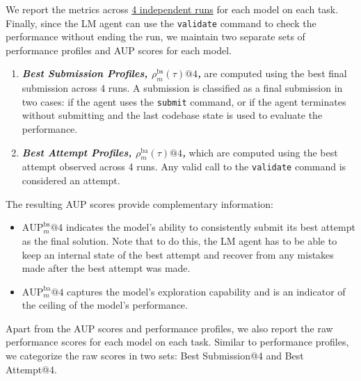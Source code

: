 \documentclass[]{fairmeta}
\newcommand{\ibold}[1]{\textbf{\textit{#1}}}
\newcommand{\nr}[1]{\colorbox{Emerald}{\textcolor{white}{Nick}}\textcolor{Emerald}{\textbf{:#1}}}
\begin{document}
We report the metrics across \ul{4 independent runs} for each model on each task.
%
Finally, since the LM agent can use the \texttt{validate} command to check the performance without ending the run, we maintain two separate sets of performance profiles and AUP scores for each model.
\begin{enumerate}
    \item \ibold{Best Submission Profiles, $\rho^{\text{bs}}_m(\tau)@4$,} are computed using the best final submission across 4 runs. A submission is classified as a final submission in two cases: if the agent uses the \texttt{submit} command, or if the agent terminates without submitting and the last codebase state is used to evaluate the performance.
    \item \ibold{Best Attempt Profiles, $\rho^{\text{ba}}_m(\tau)@4$,} which are computed using the best attempt observed across 4 runs. Any valid call to the \texttt{validate} command is considered an attempt.
\end{enumerate}
%
%
%
The resulting AUP scores provide complementary information:
\begin{itemize}
    \item \ibold{$\text{AUP}^{\text{bs}}_m@4$} indicates the model's ability to consistently submit its best attempt as the final solution. Note that to do this, the LM agent has to be able to keep an internal state of the best attempt and recover from any mistakes made after the best attempt was made.
    \item \ibold{$\text{AUP}^{\text{ba}}_m@4$} captures the model's exploration capability and is an indicator of the ceiling of the model's performance.
\end{itemize}

Apart from the AUP scores and performance profiles, we also report the raw performance scores for each model on each task.
%
Similar to performance profiles, we categorize the raw scores in two sets: Best Submission@4 and Best Attempt@4.

\end{document}
